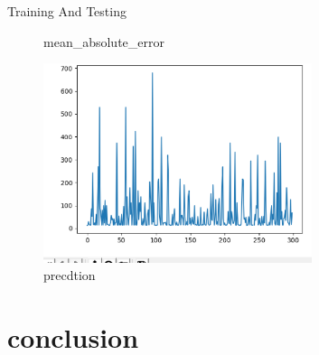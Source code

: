 \documentclass[
 size=14pt,
 paper=smartboard,  %
 mode=present, 		%
 display=slides, 	%
 style=tuliplab,  	%
 pauseslide,
 fleqn,leqno]{powerdot}
\begin{document}
\begin{slide}{Training And Testing}
\begin{figure}[htbp]
\begin{minipage}[t]{0.38\textwidth}
    \vspace{-1.0em}
    \caption{mean_absolute_error}
  \end{minipage}
  \begin{minipage}[t]{0.38\textwidth}
    \centering
    \includegraphics[width=0.7\textwidth]{logos/1 (3).eps}
    \vspace{-1.0em}
    \caption{precdtion}
  \end{minipage}
  
\end{figure}
\end{slide}







\section{conclusion}
\end{document}
